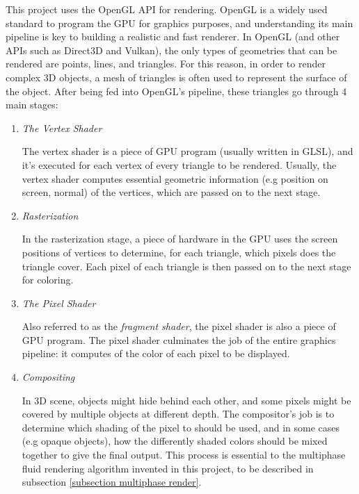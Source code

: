 This project uses the OpenGL API for rendering. OpenGL is a widely used standard to program the GPU for graphics purposes, and understanding its main pipeline is key to building a realistic and fast renderer. In OpenGL (and other APIs such as Direct3D and Vulkan), the only types of geometries that can be rendered are points, lines, and triangles. For this reason, in order to render complex 3D objects, a mesh of triangles is often used to represent the surface of the object. After being fed into OpenGL's pipeline, these triangles go through 4 main stages:
\begin{enumerate}
    \item 
    \textit{The Vertex Shader}

    The vertex shader is a piece of GPU program (usually written in GLSL), and it's executed for each vertex of every triangle to be rendered. Usually, the vertex shader computes essential geometric information (e.g position on screen, normal) of the vertices, which are passed on to the next stage.
    
    \item 
    \textit{Rasterization}

    In the rasterization stage, a piece of hardware in the GPU uses the screen positions of vertices to determine, for each triangle, which pixels does the triangle cover. Each pixel of each triangle is then passed on to the next stage for coloring.
    
    \item
    \textit{The Pixel Shader}

    Also referred to as the \textit{fragment shader}, the pixel shader is also a piece of GPU program. The pixel shader culminates the job of the entire graphics pipeline: it computes of the color of each pixel to be displayed.

    \item 
    \textit{Compositing}

    In 3D scene, objects might hide behind each other, and some pixels might be covered by multiple objects at different depth. The compositor's job is to determine which shading of the pixel to should be used, and in some cases (e.g opaque objects), how the differently shaded colors should be mixed together to give the final output. This process is essential to the multiphase fluid rendering algorithm invented in this project, to be described in subsection \ref{subsection multiphase render}.
    
\end{enumerate}

